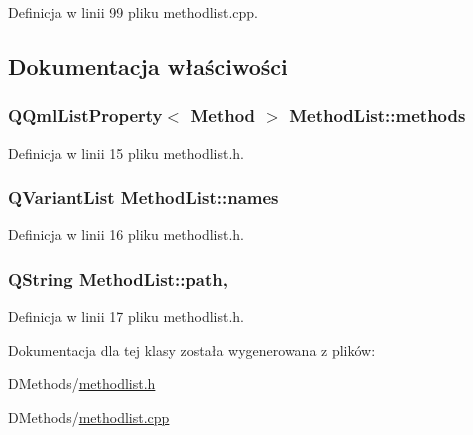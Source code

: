 Definicja w linii 99 pliku methodlist.\-cpp.



\subsection{Dokumentacja właściwości}
\hypertarget{class_method_list_a10fa462526af745e0ef24c024a7e252e}{
\subsubsection[{methods}]{\setlength{\rightskip}{0pt plus 5cm}Q\-Qml\-List\-Property$<$ {\bf Method} $>$ Method\-List\-::methods\hspace{0.3cm}{\ttfamily [read]}}}\label{class_method_list_a10fa462526af745e0ef24c024a7e252e}


Definicja w linii 15 pliku methodlist.\-h.

\hypertarget{class_method_list_ac96a3d7bc8ad7419795cf194448ca2c4}{
\subsubsection[{names}]{\setlength{\rightskip}{0pt plus 5cm}Q\-Variant\-List Method\-List\-::names\hspace{0.3cm}{\ttfamily [read]}}}\label{class_method_list_ac96a3d7bc8ad7419795cf194448ca2c4}


Definicja w linii 16 pliku methodlist.\-h.

\hypertarget{class_method_list_aac51cd62c2c4e2cfb7a4a8053555ea61}{
\subsubsection[{path}]{\setlength{\rightskip}{0pt plus 5cm}Q\-String Method\-List\-::path\hspace{0.3cm}{\ttfamily [read]}, {\ttfamily [write]}}}\label{class_method_list_aac51cd62c2c4e2cfb7a4a8053555ea61}


Definicja w linii 17 pliku methodlist.\-h.



Dokumentacja dla tej klasy została wygenerowana z plików\-:\begin{DoxyCompactItemize}
\item 
D\-Methods/\hyperlink{methodlist_8h}{methodlist.\-h}\item 
D\-Methods/\hyperlink{methodlist_8cpp}{methodlist.\-cpp}\end{DoxyCompactItemize}
